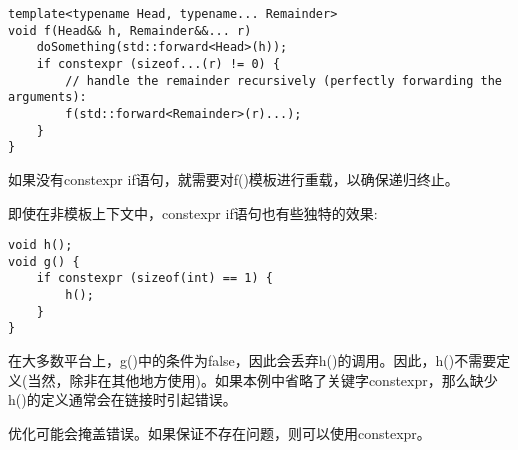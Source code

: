 \begin{lstlisting}[style=styleCXX]
template<typename Head, typename... Remainder>
void f(Head&& h, Remainder&&... r) 
	doSomething(std::forward<Head>(h));
	if constexpr (sizeof...(r) != 0) {
		// handle the remainder recursively (perfectly forwarding the arguments):
		f(std::forward<Remainder>(r)...);
	}
}
\end{lstlisting}

如果没有constexpr if语句，就需要对f()模板进行重载，以确保递归终止。

即使在非模板上下文中，constexpr if语句也有些独特的效果:

\begin{lstlisting}[style=styleCXX]
void h();
void g() {
	if constexpr (sizeof(int) == 1) {
		h();
	}
}
\end{lstlisting}

在大多数平台上，g()中的条件为false，因此会丢弃h()的调用。因此，h()不需要定义(当然，除非在其他地方使用)。如果本例中省略了关键字constexpr，那么缺少h()的定义通常会在链接时引起错误。

\begin{tcolorbox}[colback=webgreen!5!white,colframe=webgreen!75!black]
\hspace*{0.75cm}优化可能会掩盖错误。如果保证不存在问题，则可以使用constexpr。
\end{tcolorbox}























